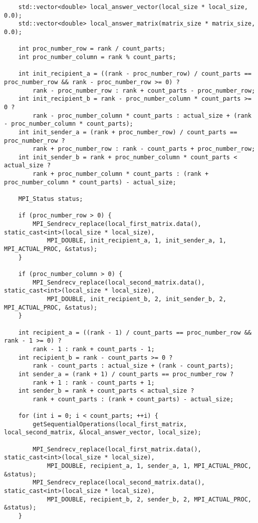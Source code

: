 \documentclass{report}
\begin{document}
\begin{lstlisting}
    std::vector<double> local_answer_vector(local_size * local_size, 0.0);
    std::vector<double> local_answer_matrix(matrix_size * matrix_size, 0.0);

    int proc_number_row = rank / count_parts;
    int proc_number_column = rank % count_parts;

    int init_recipient_a = ((rank - proc_number_row) / count_parts == proc_number_row && rank - proc_number_row >= 0) ?
        rank - proc_number_row : rank + count_parts - proc_number_row;
    int init_recipient_b = rank - proc_number_column * count_parts >= 0 ?
        rank - proc_number_column * count_parts : actual_size + (rank - proc_number_column * count_parts);
    int init_sender_a = (rank + proc_number_row) / count_parts == proc_number_row ?
        rank + proc_number_row : rank - count_parts + proc_number_row;
    int init_sender_b = rank + proc_number_column * count_parts < actual_size ?
        rank + proc_number_column * count_parts : (rank + proc_number_column * count_parts) - actual_size;

    MPI_Status status;

    if (proc_number_row > 0) {
        MPI_Sendrecv_replace(local_first_matrix.data(), static_cast<int>(local_size * local_size),
            MPI_DOUBLE, init_recipient_a, 1, init_sender_a, 1, MPI_ACTUAL_PROC, &status);
    }

    if (proc_number_column > 0) {
        MPI_Sendrecv_replace(local_second_matrix.data(), static_cast<int>(local_size * local_size),
            MPI_DOUBLE, init_recipient_b, 2, init_sender_b, 2, MPI_ACTUAL_PROC, &status);
    }

    int recipient_a = ((rank - 1) / count_parts == proc_number_row && rank - 1 >= 0) ?
        rank - 1 : rank + count_parts - 1;
    int recipient_b = rank - count_parts >= 0 ?
        rank - count_parts : actual_size + (rank - count_parts);
    int sender_a = (rank + 1) / count_parts == proc_number_row ?
        rank + 1 : rank - count_parts + 1;
    int sender_b = rank + count_parts < actual_size ?
        rank + count_parts : (rank + count_parts) - actual_size;

    for (int i = 0; i < count_parts; ++i) {
        getSequentialOperations(local_first_matrix, local_second_matrix, &local_answer_vector, local_size);

        MPI_Sendrecv_replace(local_first_matrix.data(), static_cast<int>(local_size * local_size),
            MPI_DOUBLE, recipient_a, 1, sender_a, 1, MPI_ACTUAL_PROC, &status);
        MPI_Sendrecv_replace(local_second_matrix.data(), static_cast<int>(local_size * local_size),
            MPI_DOUBLE, recipient_b, 2, sender_b, 2, MPI_ACTUAL_PROC, &status);
    }


\end{lstlisting}
\end{document}
